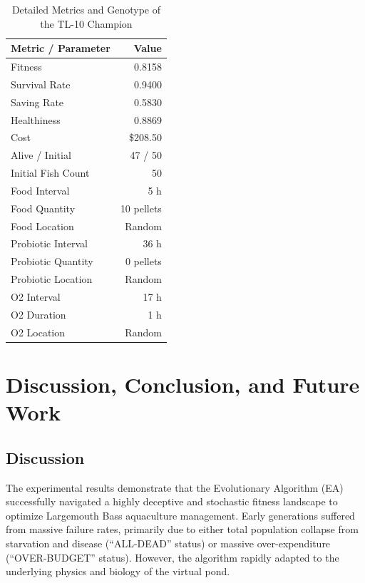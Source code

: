 \documentclass[conference]{IEEEtran}
\begin{document}
\begin{table}[H]
\centering
\caption{Detailed Metrics and Genotype of the TL-10 Champion}
\label{tab:champ_tl10}
\begin{tabular}{|l|r|}
\hline
\textbf{Metric / Parameter} & \textbf{Value} \\ \hline
Fitness & 0.8158 \\ \hline
Survival Rate & 0.9400 \\ \hline
Saving Rate & 0.5830 \\ \hline
Healthiness & 0.8869 \\ \hline
Cost & \$208.50 \\ \hline
Alive / Initial & 47 / 50 \\ \hline
Initial Fish Count & 50 \\ \hline
Food Interval & 5 h \\ \hline
Food Quantity & 10 pellets \\ \hline
Food Location & Random \\ \hline
Probiotic Interval & 36 h \\ \hline
Probiotic Quantity & 0 pellets \\ \hline
Probiotic Location & Random \\ \hline
O2 Interval & 17 h \\ \hline
O2 Duration & 1 h \\ \hline
O2 Location & Random \\ \hline
\end{tabular}
\end{table}



\section{Discussion, Conclusion, and Future Work}

\subsection{Discussion}
The experimental results demonstrate that the Evolutionary Algorithm (EA) successfully navigated a highly deceptive and stochastic fitness landscape to optimize Largemouth Bass aquaculture management. Early generations suffered from massive failure rates, primarily due to either total population collapse from starvation and disease (``ALL-DEAD'' status) or massive over-expenditure (``OVER-BUDGET'' status). However, the algorithm rapidly adapted to the underlying physics and biology of the virtual pond. 
\end{document}
